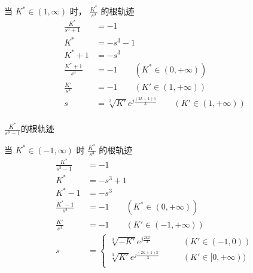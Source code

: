 \begin{frame}{ 当 $K^*\in(1,\infty)$ 时， $\frac{K^*}{s^3}$ 的根轨迹}
\begin{align*}
\frac{K^*}{s^3+1}&=-1 \\
K^* &=-s^3-1 \\
K^*+1 &=-s^3 \\
\frac{K^*+1}{s^3} &=-1 \qquad (K^*\in (0,+\infty))\\
\frac{K'}{s^3} &=-1 \qquad (K'\in (1,+\infty))\\
s &=\sqrt[3]{K'}e^{j\frac{(2k+1)\pi}{3}} \qquad (K'\in (1,+\infty))\\
\end{align*}
\end{frame}

\begin{frame}{$\frac{K^*}{s^3-1}$的根轨迹}
\begin{center}
\end{center}
\end{frame}

\begin{frame}{当 $K^*\in(-1,\infty)$ 时 $\frac{K^*}{s^3}$ 的根轨迹}
\begin{align*}
\frac{K^*}{s^3-1}&=-1 \\
K^* &=-s^3+1 \\
K^* -1 &=-s^3 \\
\frac{K^*-1}{s^3} &=-1 \qquad (K^*\in (0,+\infty))\\
\frac{K'}{s^3} &=-1 \qquad (K'\in (-1,+\infty))\\
s &=\begin{cases}
\sqrt[3]{-K'}e^{j\frac{2k\pi}{3}} & \qquad (K'\in (-1,0))\\
\sqrt[3]{K'} e^{j\frac{(2k+1)\pi}{3}}  & \qquad (K'\in [0,+\infty))\\
\end{cases}
\end{align*}
\end{frame}


	

